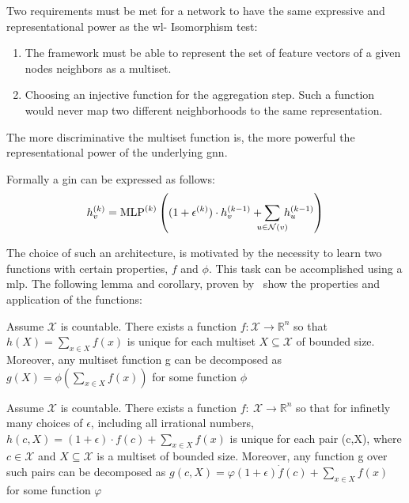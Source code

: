 Two requirements must be met for a network to have the same expressive and representational
power as the \ac{wl}- Isomorphism test:
\begin{enumerate}
    \item The framework must be able to represent the set of feature vectors of a given nodes
          neighbors as a multiset.
    \item Choosing an injective function for the aggregation step. Such a function would never
          map two different neighborhoods to the same representation.
\end{enumerate}
The more discriminative the multiset function is, the more powerful the representational power of the underlying \ac{gnn}.

Formally a \acf{gin} can be expressed as follows:
\begin{align*}
    h^{(k)}_{v}  = \mathrm{MLP}^{(k)} \left((1 + \epsilon^{(k)}) \cdot h^{(k-1)}_{v} + \smashoperator{\sum_{{u} \in{\mathcal{N}(v)}}} \,h^{(k-1)}_{u}\right) \\
\end{align*}

The choice of such an architecture, is motivated by the necessity to learn two functions with certain properties,
$f$ and $\phi$. This task can be accomplished using a \ac{mlp}.
The following lemma and corollary, proven by~\citet{Xu2019} show the properties and application of the functions:

\begin{lem}
    Assume $\mathcal{X}$ is countable. There exists a function $f:\mathcal{X} \rightarrow \mathbb{R}^n$
    so that $h(X) = \sum_{x \in X}f(x)$ is unique for each multiset $X \subseteq \mathcal{X}$ of
    bounded size. Moreover, any multiset function g can be decomposed as $g(X) = \phi(\sum_{x \in X}f(x))$
    for some function $\phi$
\end{lem}

\begin{cor}
    Assume $\mathcal{X}$ is countable. There exists a function $f:\ \mathcal{X} \rightarrow \mathbb{R}^n$
    so that for infinetly many choices of $\epsilon$, including all irrational numbers, $h(c,X) = (1+ \epsilon)\cdot f(c) + \sum_{x \in X}f(x)$
    is unique for each pair (c,X), where $c \in \mathcal{X}$ and $X \subseteq \mathcal{X}$ is a multiset of bounded
    size. Moreover, any function g over such pairs can be decomposed as $g(c,X) = \varphi(1+\epsilon)\dot f(c) +\sum_{x \in X}f(x)$
    for some function $\varphi$
\end{cor}

